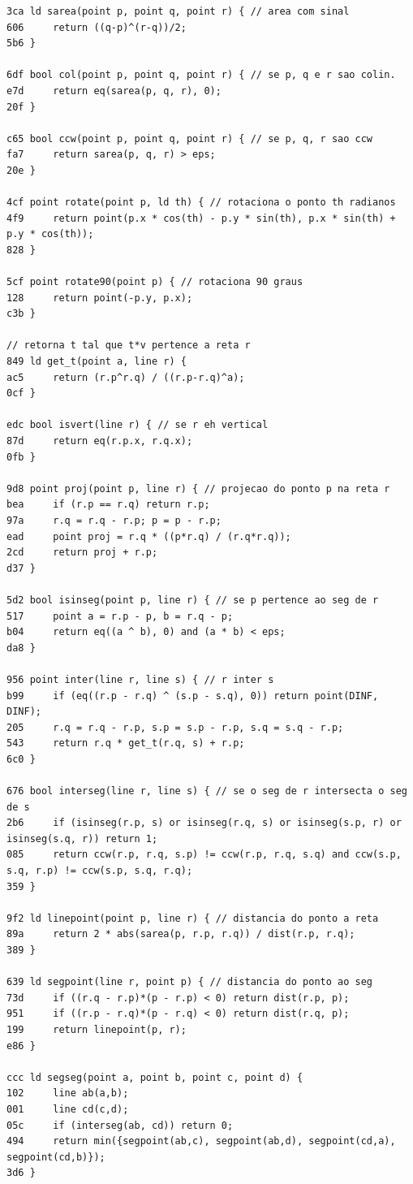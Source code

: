 \documentclass[11pt, a4paper, twoside]{article}
\begin{document}
{\begin{lstlisting}
3ca ld sarea(point p, point q, point r) { // area com sinal
606 	return ((q-p)^(r-q))/2;
5b6 }

6df bool col(point p, point q, point r) { // se p, q e r sao colin.
e7d 	return eq(sarea(p, q, r), 0);
20f }

c65 bool ccw(point p, point q, point r) { // se p, q, r sao ccw
fa7 	return sarea(p, q, r) > eps;
20e }

4cf point rotate(point p, ld th) { // rotaciona o ponto th radianos
4f9 	return point(p.x * cos(th) - p.y * sin(th), p.x * sin(th) + p.y * cos(th));
828 }

5cf point rotate90(point p) { // rotaciona 90 graus
128 	return point(-p.y, p.x);
c3b }

// retorna t tal que t*v pertence a reta r
849 ld get_t(point a, line r) {
ac5 	return (r.p^r.q) / ((r.p-r.q)^a);
0cf }

edc bool isvert(line r) { // se r eh vertical
87d 	return eq(r.p.x, r.q.x);
0fb }

9d8 point proj(point p, line r) { // projecao do ponto p na reta r
bea 	if (r.p == r.q) return r.p;
97a 	r.q = r.q - r.p; p = p - r.p;
ead 	point proj = r.q * ((p*r.q) / (r.q*r.q));
2cd 	return proj + r.p;
d37 }

5d2 bool isinseg(point p, line r) { // se p pertence ao seg de r
517     point a = r.p - p, b = r.q - p;
b04     return eq((a ^ b), 0) and (a * b) < eps;
da8 }

956 point inter(line r, line s) { // r inter s
b99 	if (eq((r.p - r.q) ^ (s.p - s.q), 0)) return point(DINF, DINF);
205 	r.q = r.q - r.p, s.p = s.p - r.p, s.q = s.q - r.p;
543 	return r.q * get_t(r.q, s) + r.p;
6c0 }

676 bool interseg(line r, line s) { // se o seg de r intersecta o seg de s
2b6 	if (isinseg(r.p, s) or isinseg(r.q, s) or isinseg(s.p, r) or isinseg(s.q, r)) return 1;
085 	return ccw(r.p, r.q, s.p) != ccw(r.p, r.q, s.q) and ccw(s.p, s.q, r.p) != ccw(s.p, s.q, r.q);
359 }

9f2 ld linepoint(point p, line r) { // distancia do ponto a reta
89a 	return 2 * abs(sarea(p, r.p, r.q)) / dist(r.p, r.q);
389 }

639 ld segpoint(line r, point p) { // distancia do ponto ao seg
73d 	if ((r.q - r.p)*(p - r.p) < 0) return dist(r.p, p);
951 	if ((r.p - r.q)*(p - r.q) < 0) return dist(r.q, p);
199 	return linepoint(p, r);
e86 }

ccc ld segseg(point a, point b, point c, point d) {
102 	line ab(a,b);
001 	line cd(c,d);
05c     if (interseg(ab, cd)) return 0;
494 	return min({segpoint(ab,c), segpoint(ab,d), segpoint(cd,a), segpoint(cd,b)});
3d6 }


\end{lstlisting}}
\end{document}
